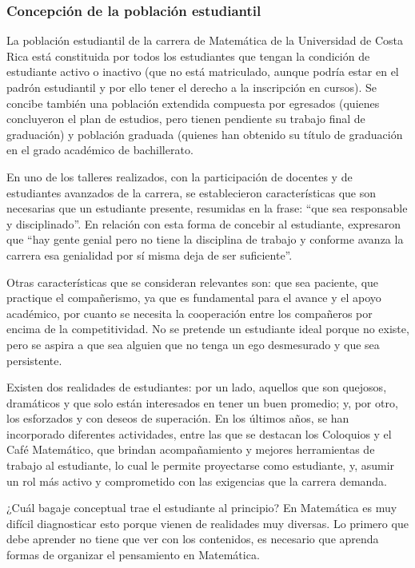 \subsubsection*{Concepción de la población estudiantil}

La población estudiantil de la carrera de Matemática de la Universidad de Costa Rica está constituida por todos los estudiantes que tengan la condición de estudiante activo o inactivo (que no está matriculado, aunque podría estar en el padrón estudiantil y por ello tener el derecho a la inscripción en cursos). Se concibe también una población extendida compuesta por egresados (quienes concluyeron el plan de estudios, pero tienen pendiente su trabajo final de graduación) y población graduada (quienes han obtenido su título de graduación en el grado académico de bachillerato. 

En uno de los talleres realizados, con la participación de docentes y de estudiantes avanzados de la carrera, se establecieron características que son necesarias que un estudiante presente, resumidas en la frase: “que sea responsable y disciplinado”. En relación con esta forma de concebir al estudiante, expresaron que “hay gente genial pero no tiene la disciplina de trabajo y conforme avanza la carrera esa genialidad por sí misma deja de ser suficiente”.

Otras características que se consideran relevantes son: que sea paciente, que practique el compañerismo, ya que es fundamental para el avance y el apoyo académico, por cuanto se necesita la cooperación entre los compañeros por encima de la competitividad. No se pretende un estudiante ideal porque no existe, pero se aspira a que sea alguien que no tenga un ego desmesurado y que sea persistente.

Existen dos realidades de estudiantes: por un lado, aquellos que son quejosos, dramáticos y que solo están interesados en tener un buen promedio; y, por otro, los esforzados y con deseos de superación. En los últimos años, se han incorporado diferentes actividades, entre las que se destacan los Coloquios y el Café Matemático, que brindan acompañamiento y mejores herramientas de trabajo al estudiante, lo cual le permite proyectarse como estudiante, y, asumir un rol más activo y comprometido con las exigencias que la carrera demanda. 

¿Cuál bagaje conceptual trae el estudiante al principio? En Matemática es muy difícil diagnosticar esto porque vienen de realidades muy diversas. Lo primero que debe aprender no tiene que ver con los contenidos, es necesario que aprenda formas de organizar el pensamiento en Matemática. 

